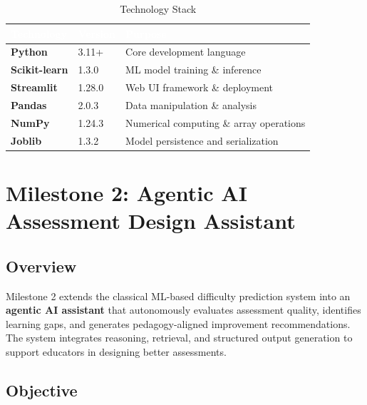 \documentclass[12pt,a4paper]{article}
\begin{document}
\begin{table}[H]
\centering
\begin{tabular}{|L{3.5cm}|C{2.5cm}|L{6cm}|}
\hline
{}
\textcolor{white}{\textbf{Technology}} &
\textcolor{white}{\textbf{Version}} &
\textcolor{white}{\textbf{Purpose}} \\
\hline
\textbf{Python}       & 3.11+ & Core development language \\
\hline
{}
\textbf{Scikit-learn} & 1.3.0 & ML model training \& inference \\
\hline
\textbf{Streamlit}    & 1.28.0 & Web UI framework \& deployment \\
\hline
{}
\textbf{Pandas}       & 2.0.3 & Data manipulation \& analysis \\
\hline
\textbf{NumPy}        & 1.24.3 & Numerical computing \& array operations \\
\hline
{}
\textbf{Joblib}       & 1.3.2 & Model persistence and serialization \\
\hline
\end{tabular}
\caption{Technology Stack}
\end{table}

\newpage
\section{Milestone 2: Agentic AI Assessment Design Assistant}

\subsection*{Overview}

Milestone 2 extends the classical ML-based difficulty prediction system into an
\textbf{agentic AI assistant} that autonomously evaluates assessment quality, identifies
learning gaps, and generates pedagogy-aligned improvement recommendations. The system
integrates reasoning, retrieval, and structured output generation to support educators in
designing better assessments.

\subsection*{Objective}
\end{document}
